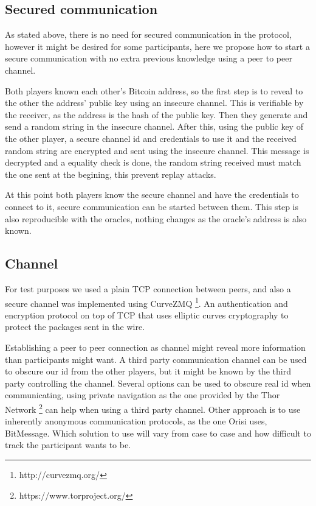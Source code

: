 \subsection{Secured communication} \label{subsec:secured_comm}

As stated above, there is no need for secured communication in the protocol,
  however it might be desired for some participants, here we propose how to
  start a secure communication with no extra previous knowledge using a peer
  to peer channel.

Both players known each other's Bitcoin address, so the first step is to
  reveal to the other the address' public key using an insecure channel.
This is verifiable by the receiver, as the address is the hash of the public
  key.
Then they generate and send a random string in the insecure channel.
After this, using the public key of the other player, a secure channel id and
  credentials to use it and the received random string are encrypted and sent
  using the insecure channel.
This message is decrypted and a equality check is done, the random string
  received must match the one sent at the begining, this prevent replay
  attacks.

At this point both players know the secure channel and have the credentials
  to connect to it, secure communication can be started between them. This
  step is also reproducible with the oracles, nothing changes as the oracle's
  address is also known.

\subsection{Channel}

For test purposes we used a plain TCP connection between peers, and also
  a secure channel was implemented using
  CurveZMQ \footnote{http://curvezmq.org/}.
An authentication and encryption protocol on top of TCP that uses elliptic
  curves cryptography to protect the packages sent in the wire.

Establishing a peer to peer connection as channel might reveal more information
  than participants might want.
A third party communication channel can be used to obscure our id from the other
  players, but it might be known by the third party controlling the channel.
Several options can be used to obscure real id when communicating, using private
  navigation as the one provided by the Thor Network
  \footnote{https://www.torproject.org/} can help when using a third party
  channel.
Other approach is to use inherently anonymous communication protocols, as the
  one Orisi uses, BitMessage\cite{warren2012bitmessage}.
Which solution to use will vary from case to case and how difficult to track
  the participant wants to be.

